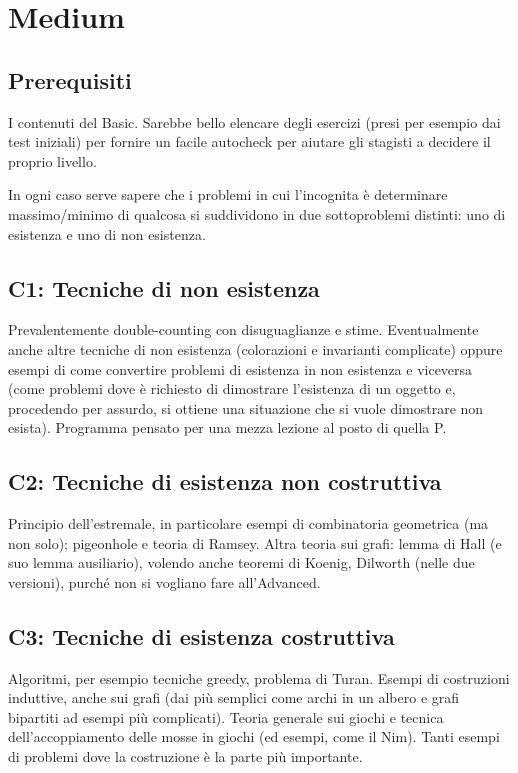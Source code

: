 \documentclass[a4paper,10pt]{article}
\begin{document}
\section{Medium}
\subsection{Prerequisiti}
I contenuti del Basic. Sarebbe bello elencare degli esercizi (presi per esempio dai test iniziali) per fornire un facile autocheck per aiutare gli stagisti a decidere il proprio livello.

In ogni caso serve sapere che i problemi in cui l'incognita è determinare massimo/minimo di qualcosa si suddividono in due sottoproblemi distinti: uno di esistenza e uno di non esistenza.


\subsection{C1: Tecniche di non esistenza}
Prevalentemente double-counting con disuguaglianze e stime. Eventualmente anche altre tecniche di non esistenza (colorazioni e invarianti complicate) oppure esempi di come convertire problemi di esistenza in non esistenza e viceversa (come problemi dove è richiesto di dimostrare l'esistenza di un oggetto e, procedendo per assurdo, si ottiene una situazione che si vuole dimostrare non esista). Programma pensato per una mezza lezione al posto di quella P.

\subsection{C2: Tecniche di esistenza non costruttiva}
Principio dell'estremale, in particolare esempi di combinatoria geometrica (ma non solo); pigeonhole e teoria di Ramsey. Altra teoria sui grafi: lemma di Hall (e suo lemma ausiliario), volendo anche teoremi di Koenig, Dilworth (nelle due versioni), purché non si vogliano fare all'Advanced.


\subsection{C3: Tecniche di esistenza costruttiva}
Algoritmi, per esempio tecniche greedy, problema di Turan. Esempi di costruzioni induttive, anche sui grafi (dai più semplici come archi in un albero e grafi bipartiti ad esempi più complicati). Teoria generale sui giochi e tecnica dell'accoppiamento delle mosse in giochi (ed esempi, come il Nim). Tanti esempi di problemi dove la costruzione è la parte più importante.
\end{document}
